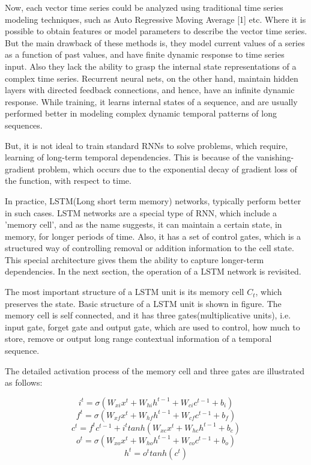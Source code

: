Now, each vector time series could be  analyzed using traditional time series modeling techniques,
such as Auto Regressive Moving Average [1] etc. Where it is possible to obtain features or model parameters to describe the
vector time series. 
But the main drawback of these methods is, they model current values of a series as a function of past values,
and have finite dynamic response to time series input. Also they lack the ability to grasp the internal state 
representations of a complex time series. Recurrent neural nets, on the other hand, maintain hidden layers with directed feedback connections, and hence,
have an infinite dynamic response. While training, it learns internal states of a sequence,
and are usually performed better in modeling complex dynamic temporal patterns of long sequences.


But, it is not ideal to train standard RNNs to solve problems,
which require, learning of long-term temporal dependencies. This is because of the vanishing-gradient problem, which occurs
due to the exponential decay of gradient loss of the function, with respect to time. 

In practice, LSTM(Long short term memory) networks, typically perform better in such cases.
LSTM networks are a special type of RNN, which include a 'memory cell', and as the name suggests,
it can maintain a certain state, in memory, for longer periods of time. 
Also, it has a set of control gates, which is a structured way of controlling removal or addition information to the cell state.
This special architecture gives them the ability to capture longer-term dependencies. In the next section, the operation of a LSTM
network is revisited.

The most important structure of a LSTM unit is its memory cell $C_{t}$, which preserves the state. Basic structure of a LSTM
unit is shown in figure. The memory cell is self connected, and it has three gates(multiplicative units), i.e. input gate, forget gate and 
output gate, which are used to control, how much to store, remove or output long range contextual information of a temporal sequence.

The detailed activation process of the memory cell and three gates are
illustrated as follows:

\begin{equation}
i^{t} = \sigma (W_{xi}x^t + W_{hi}h^{t-1} + W_{ci}c^{t-1} + b_{i})
\end{equation}
\begin{equation}
f^{t} = \sigma (W_{xf}x^t + W_{hf}h^{t-1} + W_{cf}c^{t-1} + b_{f})
\end{equation}
\begin{equation}
c^{t} = f^tc^{t-1} + i^ttanh(W_{xc}x^t + W_{hc}h^{t-1} + b_{c})
\end{equation}
\begin{equation}
o^{t} = \sigma (W_{xo}x^t + W_{ho}h^{t-1} + W_{co}c^{t-1} + b_{o})
\end{equation}
\begin{equation}
h^t = o^ttanh(c^t)
\end{equation}

